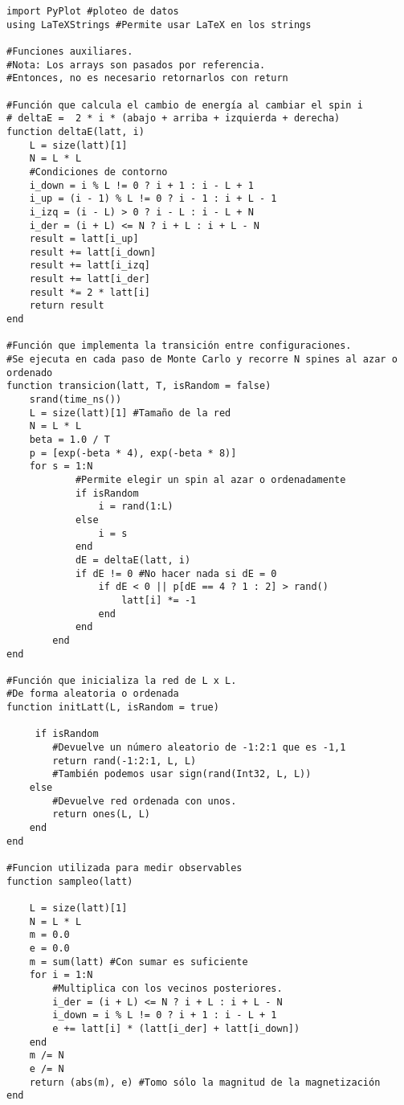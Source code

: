 {\footnotesize
\begin{lstlisting}[inputencoding=utf8,extendedchars=true]
import PyPlot #ploteo de datos
using LaTeXStrings #Permite usar LaTeX en los strings

#Funciones auxiliares. 
#Nota: Los arrays son pasados por referencia.
#Entonces, no es necesario retornarlos con return

#Función que calcula el cambio de energía al cambiar el spin i
# deltaE =  2 * i * (abajo + arriba + izquierda + derecha)
function deltaE(latt, i)
    L = size(latt)[1]
    N = L * L
    #Condiciones de contorno
    i_down = i % L != 0 ? i + 1 : i - L + 1
    i_up = (i - 1) % L != 0 ? i - 1 : i + L - 1
    i_izq = (i - L) > 0 ? i - L : i - L + N
    i_der = (i + L) <= N ? i + L : i + L - N
    result = latt[i_up] 
    result += latt[i_down]
    result += latt[i_izq] 
    result += latt[i_der]
    result *= 2 * latt[i] 
    return result
end

#Función que implementa la transición entre configuraciones.
#Se ejecuta en cada paso de Monte Carlo y recorre N spines al azar o ordenado
function transicion(latt, T, isRandom = false)
    srand(time_ns())
    L = size(latt)[1] #Tamaño de la red
    N = L * L 
    beta = 1.0 / T
    p = [exp(-beta * 4), exp(-beta * 8)]
    for s = 1:N
            #Permite elegir un spin al azar o ordenadamente
            if isRandom
                i = rand(1:L)
            else
                i = s
            end
            dE = deltaE(latt, i)
            if dE != 0 #No hacer nada si dE = 0
                if dE < 0 || p[dE == 4 ? 1 : 2] > rand()
                    latt[i] *= -1                
                end
            end
        end
end

#Función que inicializa la red de L x L. 
#De forma aleatoria o ordenada
function initLatt(L, isRandom = true)
    
     if isRandom
        #Devuelve un número aleatorio de -1:2:1 que es -1,1
        return rand(-1:2:1, L, L)
        #También podemos usar sign(rand(Int32, L, L))
    else
        #Devuelve red ordenada con unos.
        return ones(L, L)
    end
end

#Funcion utilizada para medir observables
function sampleo(latt)
    
    L = size(latt)[1]
    N = L * L
    m = 0.0
    e = 0.0
    m = sum(latt) #Con sumar es suficiente
    for i = 1:N
        #Multiplica con los vecinos posteriores.
        i_der = (i + L) <= N ? i + L : i + L - N
        i_down = i % L != 0 ? i + 1 : i - L + 1
        e += latt[i] * (latt[i_der] + latt[i_down])
    end
    m /= N
    e /= N
    return (abs(m), e) #Tomo sólo la magnitud de la magnetización
end


\end{lstlisting}}
